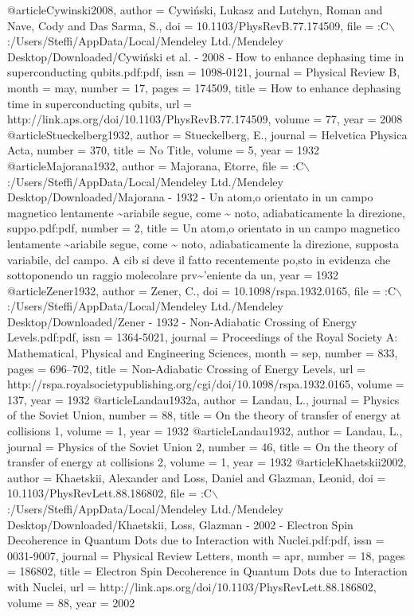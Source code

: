 @article{Cywinski2008,
author = {Cywi{\'{n}}ski, Lukasz and Lutchyn, Roman and Nave, Cody and {Das Sarma}, S.},
doi = {10.1103/PhysRevB.77.174509},
file = {:C$\backslash$:/Users/Steffi/AppData/Local/Mendeley Ltd./Mendeley Desktop/Downloaded/Cywi{\'{n}}ski et al. - 2008 - How to enhance dephasing time in superconducting qubits.pdf:pdf},
issn = {1098-0121},
journal = {Physical Review B},
month = {may},
number = {17},
pages = {174509},
title = {{How to enhance dephasing time in superconducting qubits}},
url = {http://link.aps.org/doi/10.1103/PhysRevB.77.174509},
volume = {77},
year = {2008}
}
@article{Stueckelberg1932,
author = {Stueckelberg, E.},
journal = {Helvetica Physica Acta},
number = {370},
title = {{No Title}},
volume = {5},
year = {1932}
}
@article{Majorana1932,
author = {Majorana, Etorre},
file = {:C$\backslash$:/Users/Steffi/AppData/Local/Mendeley Ltd./Mendeley Desktop/Downloaded/Majorana - 1932 - Un atom,o orientato in un campo magnetico lentamente {\~{}}ariabile segue, come {\~{}} noto, adiabaticamente la direzione, suppo.pdf:pdf},
number = {2},
title = {{Un atom,o orientato in un campo magnetico lentamente {\~{}}ariabile segue, come {\~{}} noto, adiabaticamente la direzione, supposta variabile, dcl campo. A cib si deve il fatto recentemente po,sto in evidenza che sottoponendo un raggio molecolare prv{\~{}}'eniente da un}},
year = {1932}
}
@article{Zener1932,
author = {Zener, C.},
doi = {10.1098/rspa.1932.0165},
file = {:C$\backslash$:/Users/Steffi/AppData/Local/Mendeley Ltd./Mendeley Desktop/Downloaded/Zener - 1932 - Non-Adiabatic Crossing of Energy Levels.pdf:pdf},
issn = {1364-5021},
journal = {Proceedings of the Royal Society A: Mathematical, Physical and Engineering Sciences},
month = {sep},
number = {833},
pages = {696--702},
title = {{Non-Adiabatic Crossing of Energy Levels}},
url = {http://rspa.royalsocietypublishing.org/cgi/doi/10.1098/rspa.1932.0165},
volume = {137},
year = {1932}
}
@article{Landau1932a,
author = {Landau, L.},
journal = {Physics of the Soviet Union},
number = {88},
title = {{On the theory of transfer of energy at collisions 1}},
volume = {1},
year = {1932}
}
@article{Landau1932,
author = {Landau, L.},
journal = {Physics of the Soviet Union 2},
number = {46},
title = {{On the theory of transfer of energy at collisions 2}},
volume = {1},
year = {1932}
}
@article{Khaetskii2002,
author = {Khaetskii, Alexander and Loss, Daniel and Glazman, Leonid},
doi = {10.1103/PhysRevLett.88.186802},
file = {:C$\backslash$:/Users/Steffi/AppData/Local/Mendeley Ltd./Mendeley Desktop/Downloaded/Khaetskii, Loss, Glazman - 2002 - Electron Spin Decoherence in Quantum Dots due to Interaction with Nuclei.pdf:pdf},
issn = {0031-9007},
journal = {Physical Review Letters},
month = {apr},
number = {18},
pages = {186802},
title = {{Electron Spin Decoherence in Quantum Dots due to Interaction with Nuclei}},
url = {http://link.aps.org/doi/10.1103/PhysRevLett.88.186802},
volume = {88},
year = {2002}
}
